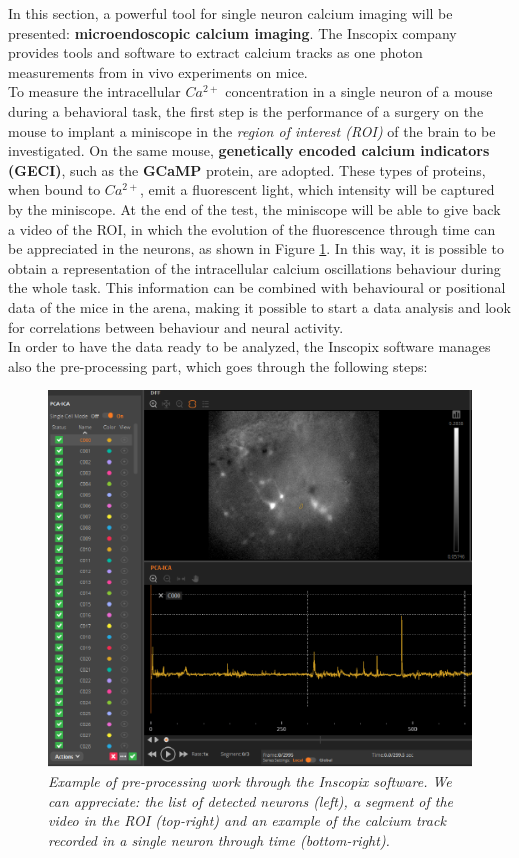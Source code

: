 \documentclass[12pt, a4paper]{report}
\begin{document}
In this section, a powerful tool for single neuron calcium imaging will be presented: \textbf{microendoscopic calcium imaging}. The Inscopix company \cite{11} %
 provides tools and software to extract calcium tracks as one photon measurements from in vivo experiments on mice.\\
To measure the intracellular $Ca^{2+}$ concentration in a single neuron of a mouse during a behavioral task, the first step is the performance of a surgery on the mouse to implant a miniscope in the \textit{region of interest (ROI)} of the brain to be investigated. On the same mouse, \textbf{genetically encoded calcium indicators (GECI)}, such as the \textbf{GCaMP} protein, are adopted. These types of proteins, when bound to $Ca^{2+}$, emit a fluorescent light, which intensity will be captured by the miniscope. At the end of the test, the miniscope will be able to give back a video of the ROI, in which the evolution of the fluorescence through time can be appreciated  in the neurons, as shown in Figure \ref{inscopix}. In this way, it is possible to obtain a representation of the intracellular calcium oscillations behaviour during the whole task. This information can be combined with behavioural or positional data of the mice in the arena, making it possible to start a data analysis and look for correlations between behaviour and neural activity.\\
In order to have the data ready to be analyzed, the Inscopix software manages also the pre-processing part, which goes through the following steps:

\begin{figure}[H]
	\begin{center}
		\includegraphics[scale=.80]{Inscopix2.png} 
	\end{center} 
	\caption{\textit{Example of pre-processing work through the Inscopix software. We can appreciate: the list of detected neurons (left), a segment of the video in the ROI (top-right) and an example of the calcium track recorded in a single neuron through time (bottom-right).}}
	\label{inscopix}
\end{figure}
\end{document}
